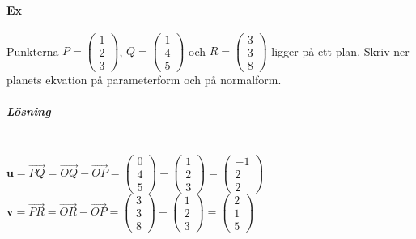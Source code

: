 \paragraph{Ex} Punkterna $P=\begin{pmatrix}
    1\\2\\3
\end{pmatrix}$, $Q=\begin{pmatrix}
    1\\4\\5
\end{pmatrix}$ och $R=\begin{pmatrix}
    3\\3\\8
\end{pmatrix}$ ligger på ett plan.
Skriv ner planets ekvation på parameterform och på normalform.
\subparagraph{Lösning} ~\\
$\bm{u}=\overrightarrow{PQ}=\overrightarrow{OQ}-\overrightarrow{OP}=\begin{pmatrix}
    0\\4\\5
\end{pmatrix}-\begin{pmatrix}
    1\\2\\3
\end{pmatrix}=\begin{pmatrix}
    -1\\2\\2
\end{pmatrix}$\\
$\bm{v}=\overrightarrow{PR}=\overrightarrow{OR}-\overrightarrow{OP}=\begin{pmatrix}
    3\\3\\8
\end{pmatrix}-\begin{pmatrix}
    1\\2\\3
\end{pmatrix}=\begin{pmatrix}
    2\\1\\5
\end{pmatrix}$\\
